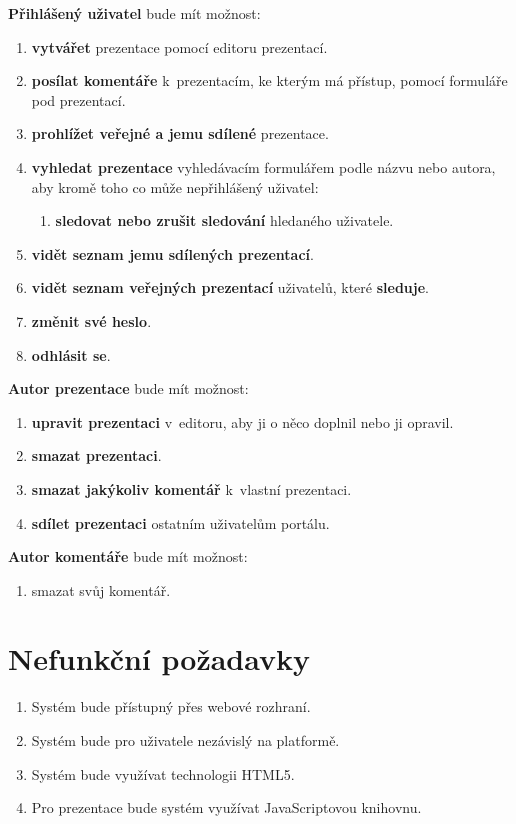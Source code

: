 \documentclass[11pt,twoside,a4paper]{book}
\begin{document}
\noindent \textbf{Přihlášený uživatel} bude mít možnost:
\begin{enumerate}
	\item \textbf{vytvářet} prezentace pomocí editoru prezentací.
	\item \textbf{posílat komentáře} k~prezentacím, ke kterým má přístup, pomocí formuláře pod prezentací.
	\item \textbf{prohlížet veřejné a jemu sdílené} prezentace.
	\item \textbf{vyhledat prezentace} vyhledávacím formulářem podle názvu nebo autora, aby kromě toho co může nepřihlášený uživatel:
		\begin{enumerate}[label*=\arabic*.]
		\item \textbf{sledovat nebo zrušit sledování} hledaného uživatele.
		\end{enumerate}
	\item \textbf{vidět seznam jemu sdílených prezentací}.
	\item \textbf{vidět seznam veřejných prezentací} uživatelů, které \textbf{sleduje}.
	\item \textbf{změnit své heslo}.
	\item \textbf{odhlásit se}.
\end{enumerate}


\noindent \textbf{Autor prezentace} bude mít možnost:
\begin{enumerate}
	\item \textbf{upravit prezentaci} v~editoru, aby ji o něco doplnil nebo ji opravil.
	\item \textbf{smazat prezentaci}.
	\item \textbf{smazat jakýkoliv komentář} k~vlastní prezentaci.
	\item \textbf{sdílet prezentaci} ostatním uživatelům portálu.
\end{enumerate}


\noindent \textbf{Autor komentáře} bude mít možnost:
\begin{enumerate}
	\item smazat svůj komentář.
\end{enumerate}


\section{Nefunkční požadavky}
\begin{enumerate}
	\item Systém bude přístupný přes webové rozhraní.
	\item Systém bude pro uživatele nezávislý na platformě.
	\item Systém bude využívat technologii HTML5.
	\item Pro prezentace bude systém využívat JavaScriptovou knihovnu.
\end{enumerate}
\end{document}

